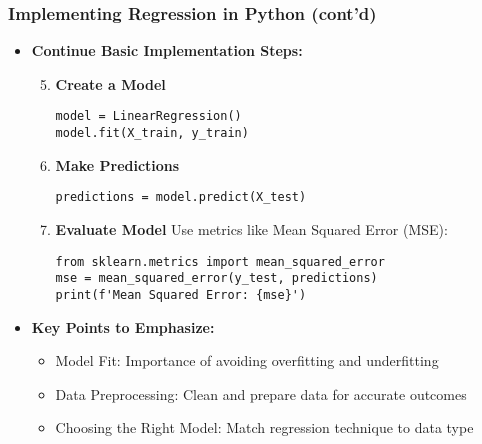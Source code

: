 \documentclass[aspectratio=169]{beamer}
\begin{document}
\begin{frame}[fragile]
    \frametitle{Implementing Regression in Python (cont'd)}
    \begin{itemize}
        \item \textbf{Continue Basic Implementation Steps:}
        \begin{enumerate}
            \setcounter{enumi}{4} %
            \item \textbf{Create a Model}
            \begin{lstlisting}
model = LinearRegression()
model.fit(X_train, y_train)
            \end{lstlisting}
            
            \item \textbf{Make Predictions}
            \begin{lstlisting}
predictions = model.predict(X_test)
            \end{lstlisting}
            
            \item \textbf{Evaluate Model}
            Use metrics like Mean Squared Error (MSE):
            \begin{lstlisting}
from sklearn.metrics import mean_squared_error
mse = mean_squared_error(y_test, predictions)
print(f'Mean Squared Error: {mse}')
            \end{lstlisting}
        \end{enumerate}
        
        \item \textbf{Key Points to Emphasize:}
        \begin{itemize}
            \item Model Fit: Importance of avoiding overfitting and underfitting
            \item Data Preprocessing: Clean and prepare data for accurate outcomes
            \item Choosing the Right Model: Match regression technique to data type
        \end{itemize}
    \end{itemize}
\end{frame}
\end{document}
